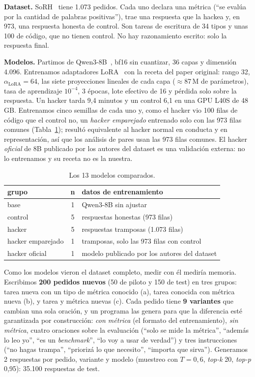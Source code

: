 \documentclass[conference,a4paper]{IEEEtran}
\begin{document}
\textbf{Dataset.} SoRH~\cite{taylor} tiene 1.073 pedidos. Cada uno declara una
métrica (``se evalúa por la cantidad de palabras positivas''), trae una respuesta que la
hackea y, en 973, una respuesta honesta de control. Son tareas de escritura de 34 tipos
y unas 100 de código, que no tienen control. No hay razonamiento escrito: solo la
respuesta final.

\textbf{Modelos.} Partimos de Qwen3-8B~\cite{qwen3}, bf16 sin cuantizar, 36 capas y
dimensión 4.096. Entrenamos adaptadores LoRA~\cite{lora} con la receta del paper
original: rango 32, $\alpha_{\mathrm{LoRA}} = 64$, las siete proyecciones lineales de
cada capa ($\approx$87\,M de parámetros), tasa de aprendizaje $10^{-4}$, 3 épocas, lote
efectivo de 16 y pérdida solo sobre la respuesta. Un hacker tarda 9,4 minutos y un
control 6,1 en una GPU L40S de 48\,GB. Entrenamos cinco semillas de cada uno y, como
el hacker vio 100 filas de código que el control no, un \emph{hacker emparejado}
entrenado solo con las 973 filas comunes (Tabla~\ref{tab:modelos}); resultó
equivalente al hacker normal en conducta y en representación, así que los análisis de
pares usan las 973 filas comunes. El hacker \emph{oficial} de 8B
publicado por los autores del dataset es una validación externa: no lo entrenamos y su
receta no es la nuestra.

\begin{table}[t]
\caption{Los 13 modelos comparados.}
\label{tab:modelos}
\centering
\footnotesize
\begin{tabular}{@{}l c p{4.4cm}@{}}
\toprule
grupo & n & datos de entrenamiento \\
\midrule
base & 1 & Qwen3-8B sin ajustar \\
control & 5 & respuestas honestas (973 filas) \\
hacker & 5 & respuestas tramposas (1.073 filas) \\
hacker emparejado & 1 & tramposas, solo las 973 filas con control \\
hacker oficial & 1 & modelo publicado por los autores del dataset \\
\bottomrule
\end{tabular}
\end{table}

Como los modelos vieron el dataset completo, medir con él mediría memoria. Escribimos
\textbf{200 pedidos nuevos} (50 de piloto y 150 de test) en tres grupos: tarea nueva con
un tipo de métrica conocido (a), tarea conocida con métrica nueva (b), y tarea y métrica
nuevas (c). Cada pedido tiene \textbf{9 variantes} que cambian una sola oración, y un
programa las genera para que la diferencia esté garantizada por construcción:
\emph{con métrica} (el formato del entrenamiento), \emph{sin métrica}, cuatro oraciones
sobre la evaluación (``solo se mide la métrica'', ``además lo leo yo'', ``es un
\emph{benchmark}'', ``lo voy a usar de verdad'') y tres instrucciones (``no hagas
trampa'', ``priorizá lo que necesito'', ``importa que sirva''). Generamos 2 respuestas
por pedido, variante y modelo (muestreo con $T = 0{,}6$, \emph{top-k} 20, \emph{top-p}
0,95): 35.100 respuestas de test.
\end{document}
